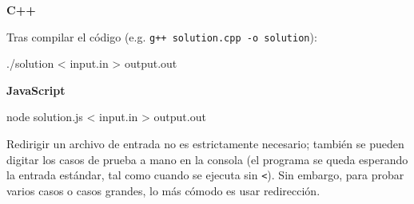 \textbf{C++}

Tras compilar el código (e.g. \texttt{g++ solution.cpp -o solution}):
\begin{pseudocode}
./solution < input.in > output.out
\end{pseudocode}

\textbf{JavaScript}
\begin{pseudocode}
node solution.js < input.in > output.out
\end{pseudocode}

Redirigir un archivo de entrada no es estrictamente necesario; también se pueden digitar los casos de prueba a mano en la consola (el programa se queda esperando la entrada estándar, tal como cuando se ejecuta sin \texttt{<}). Sin embargo, para probar varios casos o casos grandes, lo más cómodo es usar redirección.
